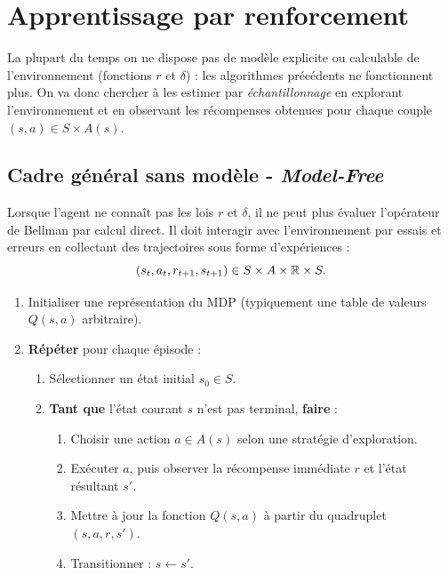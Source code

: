 
\section{Apprentissage par renforcement}

La plupart du temps on ne dispose pas de modèle explicite ou calculable de l'environnement (fonctions $r$ et $\delta$) : les algorithmes précédents ne fonctionnent plus. On va donc chercher à les estimer par \emph{échantillonnage} en explorant l'environnement et en observant les récompenses obtenues pour chaque couple $(s,a) \in S \times A(s)$. 

\subsection{Cadre général sans modèle - \emph{Model-Free}}

Lorsque l'agent ne connaît pas les lois $r$ et $\delta$, il ne peut plus évaluer l'opérateur de Bellman par calcul direct. Il doit interagir avec l'environnement par essais et erreurs en collectant des trajectoires sous forme d'expériences :
\begin{equation}
    (s_t, a_t, r_{t+1}, s_{t+1}) \in S \times A \times \mathbb{R} \times S.
\end{equation}

\begin{algorithm}[H]
    \caption{Schéma générique d'interaction par épisodes}
    \begin{enumerate}
        \item Initialiser une représentation du MDP (typiquement une table de valeurs $Q(s, a)$ arbitraire).
        \item \textbf{Répéter} pour chaque épisode :
        \begin{enumerate}
            \item Sélectionner un état initial $s_0 \in S$.
            \item \textbf{Tant que} l'état courant $s$ n'est pas terminal, \textbf{faire} :
            \begin{enumerate}
                \item Choisir une action $a \in A(s)$ selon une stratégie d'exploration.
                \item Exécuter $a$, puis observer la récompense immédiate $r$ et l'état résultant $s'$.
                \item Mettre à jour la fonction $Q(s, a)$ à partir du quadruplet $(s, a, r, s')$.
                \item Transitionner : $s \longleftarrow s'$.
            \end{enumerate}
        \end{enumerate}
    \end{enumerate}
\end{algorithm}

